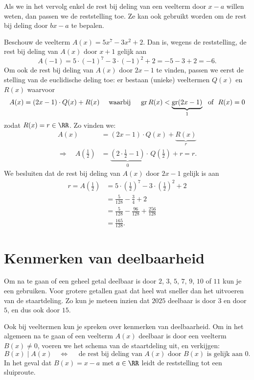 \documentclass{ximera}
\begin{document}
Als we in het vervolg enkel de rest bij deling van een veelterm door $x-a$ willen weten, dan passen we de reststelling toe. Ze kan ook gebruikt worden om de rest bij deling door $bx-a$ te bepalen. 

\begin{example}
Beschouw de veelterm $A(x) = 5x^7 - 3x^2 + 2$. Dan is, wegens de reststelling, de rest bij deling van $A(x)$ door $x+1$ gelijk aan
\[
A(-1) = 5 \cdot (-1)^7 - 3 \cdot (-1)^2 + 2 = -5-3+2 = -6.
\]
Om ook de rest bij deling van $A(x)$ door $2x-1$ te vinden, passen we eerst de stelling van de euclidische deling toe: er bestaan (unieke) veeltermen $Q(x)$ en $R(x)$ waarvoor
\[
A(x) = (2x-1)\cdot Q(x) + R(x) \quad \text{ waarbij } \quad \operatorname{gr} R(x) < \underbrace{\operatorname{gr} (2x-1)}_{1} \,\, \text{ of } \,\, R(x) = 0
\]
zodat $R(x) = r \in \RR$. Zo vinden we:
\begin{align*}
A(x) & = (2x-1) \cdot Q(x) + \underbrace{R(x)}_{r} \\
\Rightarrow \quad A\left(\frac{1}{2}\right) & = \underbrace{\left(2 \cdot \frac{1}{2}-1\right)}_{0} \cdot \,Q\left(\frac{1}{2}\right) + r = r. 
\end{align*} 
We besluiten dat de rest bij deling van $A(x)$ door $2x-1$ gelijk is aan
\begin{align*}
r = A\left(\frac{1}{2}\right) & = 5 \cdot \left(\frac{1}{2}\right)^7 - 3 \cdot \left(\frac{1}{2}\right)^2 + 2 \\
& = \frac{5}{128} - \frac{3}{4} + 2 \\
& = \frac{5}{128} - \frac{96}{128} + \frac{256}{128} \\
& = \frac{165}{128}.
\end{align*}
\end{example}

\section{Kenmerken van deelbaarheid} 

Om na te gaan of een geheel getal deelbaar is door $2$, $3$, $5$, $7$, $9$, $10$ of $11$ kun je een  gebruiken. Voor grotere getallen gaat dat heel wat sneller dan het uitvoeren van de staartdeling. Zo kun je meteen inzien dat $2025$ deelbaar is door $3$ en door $5$, en dus ook door $15$.  

Ook bij veeltermen kun je spreken over kenmerken van deelbaarheid. Om in het algemeen na te gaan of een veelterm $A(x)$ deelbaar is door een veelterm $B(x) \neq 0$, voeren we het schema van de staartdeling uit, en verkijgen:
\[
B(x) \mid A(x) \quad \Leftrightarrow \quad \text{ de rest bij deling van $A(x)$ door $B(x)$ is gelijk aan $0$.}
\] 
In het geval dat $B(x) = x-a$ met $a \in \RR$ leidt de reststelling tot een sluiproute.
\end{document}
